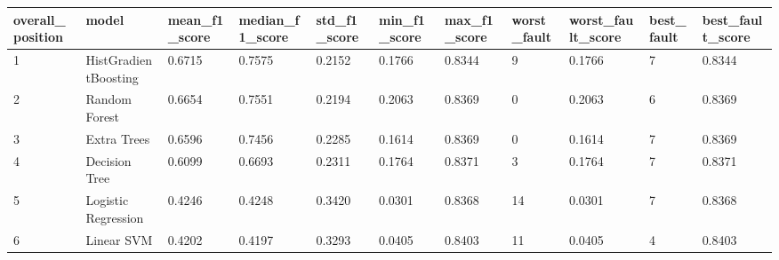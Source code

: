\begin{tabular}{lllllllllll}
\toprule
overall\_position & model & mean\_f1\_score & median\_f1\_score & std\_f1\_score & min\_f1\_score & max\_f1\_score & worst\_fault & worst\_fault\_score & best\_fault & best\_fault\_score \\
\midrule
1 & HistGradientBoosting & 0.6715 & 0.7575 & 0.2152 & 0.1766 & 0.8344 & 9 & 0.1766 & 7 & 0.8344 \\
2 & Random Forest & 0.6654 & 0.7551 & 0.2194 & 0.2063 & 0.8369 & 0 & 0.2063 & 6 & 0.8369 \\
3 & Extra Trees & 0.6596 & 0.7456 & 0.2285 & 0.1614 & 0.8369 & 0 & 0.1614 & 7 & 0.8369 \\
4 & Decision Tree & 0.6099 & 0.6693 & 0.2311 & 0.1764 & 0.8371 & 3 & 0.1764 & 7 & 0.8371 \\
5 & Logistic Regression & 0.4246 & 0.4248 & 0.3420 & 0.0301 & 0.8368 & 14 & 0.0301 & 7 & 0.8368 \\
6 & Linear SVM & 0.4202 & 0.4197 & 0.3293 & 0.0405 & 0.8403 & 11 & 0.0405 & 4 & 0.8403 \\
\bottomrule
\end{tabular}
